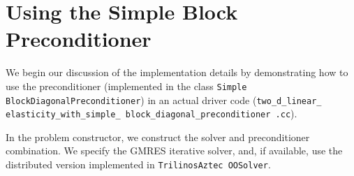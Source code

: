 
\section{Using the Simple Block Preconditioner\label{sec:using_the_simple_block_preconditioner}}

We begin our discussion of the implementation details by demonstrating how to
use the preconditioner (implemented in the class \texttt{Simple\allowbreak
  Block\allowbreak Diagonal\allowbreak Preconditioner}) in an actual driver
code (\texttt{two\_\allowbreak d\_\allowbreak linear\_\allowbreak
  elasticity\_\allowbreak with\_\allowbreak simple\_\allowbreak
  block\_\allowbreak diagonal\_\allowbreak preconditioner\allowbreak
  .\allowbreak cc}).

In the problem constructor, we construct the solver and preconditioner
combination. We specify the GMRES iterative solver, and, if available, use the
distributed version implemented in \texttt{Trilinos\allowbreak Aztec\allowbreak
  OO\allowbreak Solver}.  \lstset{numberstyle=\scriptsize,breaklines=true,
  numbers=left, stepnumber=2, frame=single,basicstyle=\ttfamily\scriptsize,
  showstringspaces=false, language=C++} 


